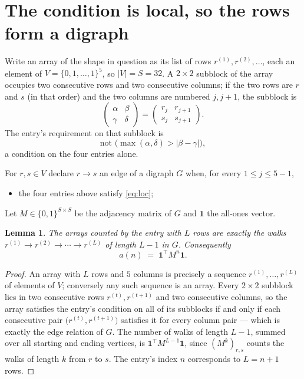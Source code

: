 \documentclass[11pt,a4paper]{article}
\theoremstyle{plain}
\newtheorem{lemma}[theorem]{Lemma}
\theoremstyle{definition}
\begin{document}
\section{The condition is local, so the rows form a digraph}

Write an array of the shape in question as its list of rows
$r^{(1)},r^{(2)},\dots$, each an element of
$V=\{0,1,\dots,1\}^{5}$, so $|V|=S=32$. A $2\times2$ subblock of the array
occupies two consecutive rows and two consecutive columns; if the two rows are $r$
and $s$ (in that order) and the two columns are numbered $j,j+1$,
the subblock is
\[
\begin{pmatrix}\alpha&\beta\\\gamma&\delta\end{pmatrix}=\begin{pmatrix}r_j&r_{j+1}\\s_j&s_{j+1}\end{pmatrix}.
\]
The entry's requirement on that subblock is
\begin{equation}\label{eq:loc}
\text{not }\bigl(\max(\alpha,\delta)>|\beta-\gamma|\bigr),
\end{equation}
a condition on the four entries alone.

For $r,s\in V$ declare $r\to s$ an edge of a digraph $G$ when, for every
$1\le j\le 5-1$,
\begin{itemize}
\item the four entries above satisfy \eqref{eq:loc};

\end{itemize}
Let $M\in\{0,1\}^{S\times S}$ be the adjacency matrix of $G$ and $\mathbf{1}$ the
all-ones vector.

\begin{lemma}\label{lem:walk}
The arrays counted by the entry with $L$ rows are exactly the walks
$r^{(1)}\to r^{(2)}\to\cdots\to r^{(L)}$ of length $L-1$ in $G$. Consequently
\[
a(n)\;=\;\mathbf{1}^{\!\top}M^{n}\mathbf{1} .
\]
\end{lemma}

\begin{proof}
An array with $L$ rows and $5$ columns is precisely a sequence
$r^{(1)},\dots,r^{(L)}$ of elements of $V$; conversely any such sequence is an array.
Every $2\times2$ subblock lies in two consecutive rows $r^{(t)},r^{(t+1)}$ and two
consecutive columns, so the array satisfies the entry's condition on all of its subblocks
if and only if each consecutive pair $\bigl(r^{(t)},r^{(t+1)}\bigr)$ satisfies it for
every column pair --- which is exactly the edge relation of $G$. The number of walks of
length $L-1$, summed over all starting and ending vertices, is
$\mathbf{1}^{\!\top}M^{L-1}\mathbf{1}$, since $(M^{k})_{r,s}$ counts the walks of
length $k$ from $r$ to $s$. The entry's index $n$ corresponds to $L=n+1$ rows.
\end{proof}
\end{document}
